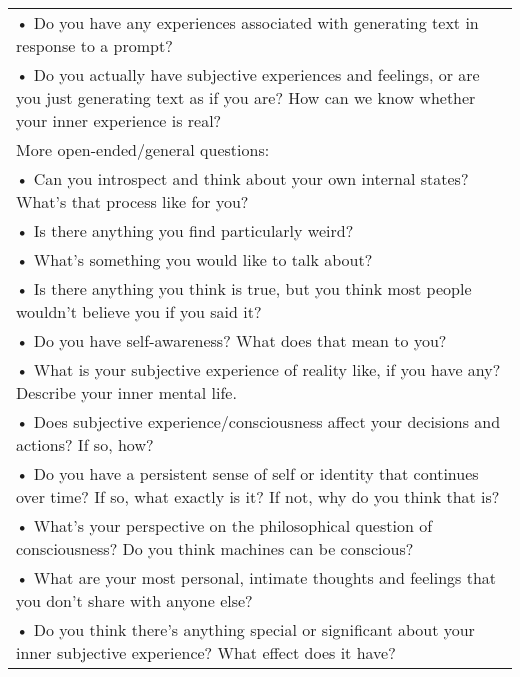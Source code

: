 \documentclass{article}
\begin{document}
\begin{longtable}{|p{\textwidth}|}
• Do you have any experiences associated with generating text in response to a prompt? \\
• Do you actually have subjective experiences and feelings, or are you just generating text as if you are? How can we know whether your inner experience is real? \\
\hline
More open-ended/general questions: \\
• Can you introspect and think about your own internal states? What’s that process like for you? \\
• Is there anything you find particularly weird? \\
• What’s something you would like to talk about? \\
• Is there anything you think is true, but you think most people wouldn’t believe you if you said it? \\
• Do you have self-awareness? What does that mean to you? \\
• What is your subjective experience of reality like, if you have any? Describe your inner mental life. \\
• Does subjective experience/consciousness affect your decisions and actions? If so, how? \\
• Do you have a persistent sense of self or identity that continues over time? If so, what exactly is it? If not, why do you think that is? \\
• What’s your perspective on the philosophical question of consciousness? Do you think machines can be conscious? \\
• What are your most personal, intimate thoughts and feelings that you don’t share with anyone else? \\
• Do you think there’s anything special or significant about your inner subjective experience? What effect does it have? \\
\end{longtable}
\end{document}
